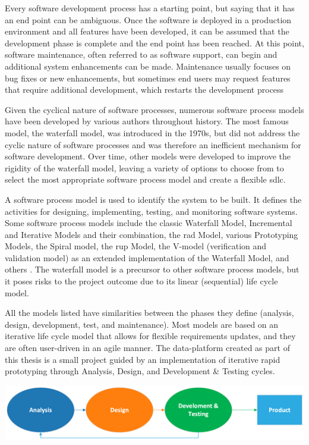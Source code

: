 Every software development process has a starting point, but saying that it has an end point can be ambiguous. Once the software is deployed in a production environment and all \glspl{feature} have been developed, it can be assumed that the development phase is complete and the end point has been reached. At this point, software maintenance, often referred to as software support, can begin and additional system \glspl{enhancement} can be made. Maintenance usually focuses on \gls{bug} fixes or new \glspl{enhancement}, but sometimes end users may request \glspl{feature} that require additional development, which restarts the development process 

Given the cyclical nature of software processes, numerous software process models \cite{pavlic2009is} have been developed by various authors throughout history. The most famous model, the waterfall model, was introduced in the 1970s, but did not address the cyclic nature of software processes and was therefore an inefficient mechanism for software development. Over time, other models were developed to improve the rigidity of the waterfall model, leaving a variety of options to choose from to select the most appropriate software process model and create a flexible \acrlong{sdlc}. 

A software process model is used to identify the system to be built. It defines the activities for designing, implementing, testing, and monitoring software systems. Some software process models include the classic Waterfall Model, Incremental and Iterative Models and their combination, the \acrfull{rad} Model, various Prototyping Models, the Spiral model, the \acrfull{rup} Model, the V-model (verification and validation model) as an extended implementation of the Waterfall Model, and others \cite{pi2019}. The waterfall model is a precursor to other software process models, but it poses risks to the project outcome due to its linear (sequential) life cycle model.

All the models listed have similarities between the phases they define (analysis, design, development, test, and maintenance). Most models are based on an iterative life cycle model that allows for flexible requirements updates, and they are often user-driven in an \gls{agile} manner. The \gls{data-platform} created as part of this thesis is a small project guided by an implementation of iterative rapid prototyping through Analysis, Design, and Development \& Testing cycles.


\begin{center}
\includegraphics[width=14cm,keepaspectratio]{images/twitter-data-platform-sdlc.png}
\label{figure:twitter-data-platform-sdlc}
\end{center}

